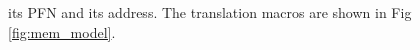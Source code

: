 its PFN and its \page address. The translation macros are shown in Fig \ref{fig:mem_model}.  

\begin{comment}
\textcolor{olive}{
\subsection{breaking kaslr with leaked pointers}
Please make prev section coherent...
\begin{itemize}
    \item PUD alignment
    \item page\_offset\_base
    \item vmemmap\_base
    \item kernel text offset
\end{itemize}}
\end{comment}
